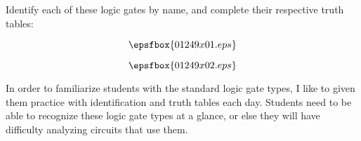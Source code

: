 

Identify each of these logic gates by name, and complete their respective truth tables:

$$\epsfbox{01249x01.eps}$$







$$\epsfbox{01249x02.eps}$$







In order to familiarize students with the standard logic gate types, I like to given them practice with identification and truth tables each day.  Students need to be able to recognize these logic gate types at a glance, or else they will have difficulty analyzing circuits that use them.




